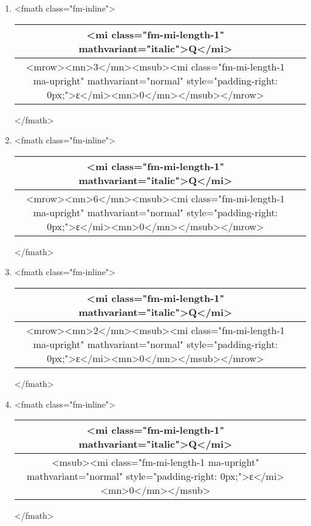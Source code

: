 \documentclass{article}
\begin{document}
\begin{enumerate}[label=(\alph*)]
\item  <fmath class="fm-inline">\begin{tabular}{|c|c|}
\hline
<mi class="fm-mi-length-1" mathvariant="italic">Q</mi> \\
\hline
<mrow><mn>3</mn><msub><mi class="fm-mi-length-1 ma-upright" mathvariant="normal" style="padding-right: 0px;">ε</mi><mn>0</mn></msub></mrow> \\
\hline
\end{tabular}
</fmath>
\item  <fmath class="fm-inline">\begin{tabular}{|c|c|}
\hline
<mi class="fm-mi-length-1" mathvariant="italic">Q</mi> \\
\hline
<mrow><mn>6</mn><msub><mi class="fm-mi-length-1 ma-upright" mathvariant="normal" style="padding-right: 0px;">ε</mi><mn>0</mn></msub></mrow> \\
\hline
\end{tabular}
</fmath>
\item  <fmath class="fm-inline">\begin{tabular}{|c|c|}
\hline
<mi class="fm-mi-length-1" mathvariant="italic">Q</mi> \\
\hline
<mrow><mn>2</mn><msub><mi class="fm-mi-length-1 ma-upright" mathvariant="normal" style="padding-right: 0px;">ε</mi><mn>0</mn></msub></mrow> \\
\hline
\end{tabular}
</fmath>
\item  <fmath class="fm-inline">\begin{tabular}{|c|c|}
\hline
<mi class="fm-mi-length-1" mathvariant="italic">Q</mi> \\
\hline
<msub><mi class="fm-mi-length-1 ma-upright" mathvariant="normal" style="padding-right: 0px;">ε</mi><mn>0</mn></msub> \\
\hline
\end{tabular}
</fmath>
\end{enumerate}
\newpage
\end{document}
